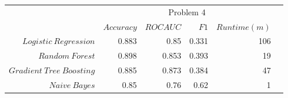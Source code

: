 \begin{table*}[htp]
\begin{tabular}{@{}rr@{\hskip 0.3cm}r@{\hskip 0.3cm}r@{\hskip 0.3cm}rc@{}}
			\bottomrule
		\end{tabular}
		\medskip
		\begin{tabular}{@{}rr@{\hskip 0.3cm}r@{\hskip 0.3cm}r@{\hskip 0.3cm}rc@{}} \toprule
			&  \multicolumn{4}{c}{Problem 4} \\
			\cmidrule{2-5}
			& $Accuracy$ & $ROC AUC$ & $F1$ & $Runtime  (m)$ \\ \midrule
			$Logistic \ Regression$     & 0.883 & 0.85  & 0.331 & 106 \\
			$Random \ Forest$            & 0.898 & 0.853 & 0.393 & 19 \\
			$Gradient \ Tree \ Boosting$ & 0.885 & 0.873 & 0.384 & 47 \\
			$Naive \ Bayes$               & 0.85  & 0.76  & 0.62 & 1 \\

			\bottomrule
		\end{tabular}
	\end{table*}

\medskip

%
%

